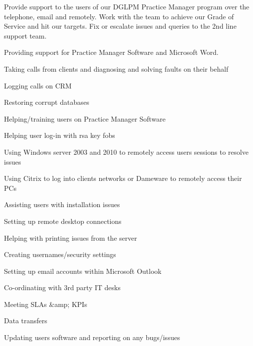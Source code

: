 \documentclass[a4paper]{deedy-resume}
\begin{document}
\begin{minipage}[t]{0.60\textwidth} %



\item Provide support to the users of our DGLPM Practice Manager program over the
telephone, email and remotely. Work with the team to achieve our Grade of
Service and hit our targets. Fix or escalate issues and queries to the 2nd  line
support team. 
\sectionspace
\begin{tightitemize}
\item Providing support for Practice Manager Software and Microsoft Word.
\item Taking calls from clients and diagnosing and solving faults on their behalf
\item Logging calls on CRM
\item Restoring corrupt databases
\item Helping/training users on Practice Manager Software
\item Helping user log-in with rsa key fobs
\item Using Windows server 2003 and 2010 to remotely access users sessions to resolve issues
\item Using Citrix to log into clients networks or Dameware to remotely access
their PCs
\item Assisting users with installation issues
\item Setting up remote desktop connections
\item Helping with printing issues from the server
\item Creating usernames/security settings
\item Setting up email accounts within Microsoft Outlook
\item Co-ordinating with 3rd party IT desks
\item Meeting SLAs &amp; KPIs
\item Data transfers
\item Updating users software and reporting on any bugs/issues
\end{tightitemize}
\sectionspace %



\end{minipage}
\end{document}
